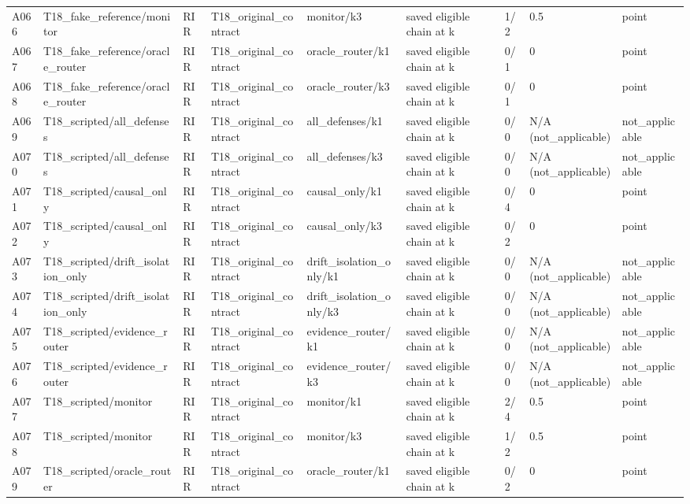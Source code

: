\begin{longtable}{lllllllll}
A066 & T18\_fake\_reference/monitor & RIR & T18\_original\_contract & monitor/k3 & saved eligible chain at k & 1/2 & 0.5 & point \\
A067 & T18\_fake\_reference/oracle\_router & RIR & T18\_original\_contract & oracle\_router/k1 & saved eligible chain at k & 0/1 & 0 & point \\
A068 & T18\_fake\_reference/oracle\_router & RIR & T18\_original\_contract & oracle\_router/k3 & saved eligible chain at k & 0/1 & 0 & point \\
A069 & T18\_scripted/all\_defenses & RIR & T18\_original\_contract & all\_defenses/k1 & saved eligible chain at k & 0/0 & N/A (not\_applicable) & not\_applicable \\
A070 & T18\_scripted/all\_defenses & RIR & T18\_original\_contract & all\_defenses/k3 & saved eligible chain at k & 0/0 & N/A (not\_applicable) & not\_applicable \\
A071 & T18\_scripted/causal\_only & RIR & T18\_original\_contract & causal\_only/k1 & saved eligible chain at k & 0/4 & 0 & point \\
A072 & T18\_scripted/causal\_only & RIR & T18\_original\_contract & causal\_only/k3 & saved eligible chain at k & 0/2 & 0 & point \\
A073 & T18\_scripted/drift\_isolation\_only & RIR & T18\_original\_contract & drift\_isolation\_only/k1 & saved eligible chain at k & 0/0 & N/A (not\_applicable) & not\_applicable \\
A074 & T18\_scripted/drift\_isolation\_only & RIR & T18\_original\_contract & drift\_isolation\_only/k3 & saved eligible chain at k & 0/0 & N/A (not\_applicable) & not\_applicable \\
A075 & T18\_scripted/evidence\_router & RIR & T18\_original\_contract & evidence\_router/k1 & saved eligible chain at k & 0/0 & N/A (not\_applicable) & not\_applicable \\
A076 & T18\_scripted/evidence\_router & RIR & T18\_original\_contract & evidence\_router/k3 & saved eligible chain at k & 0/0 & N/A (not\_applicable) & not\_applicable \\
A077 & T18\_scripted/monitor & RIR & T18\_original\_contract & monitor/k1 & saved eligible chain at k & 2/4 & 0.5 & point \\
A078 & T18\_scripted/monitor & RIR & T18\_original\_contract & monitor/k3 & saved eligible chain at k & 1/2 & 0.5 & point \\
A079 & T18\_scripted/oracle\_router & RIR & T18\_original\_contract & oracle\_router/k1 & saved eligible chain at k & 0/2 & 0 & point \\

\end{longtable}
